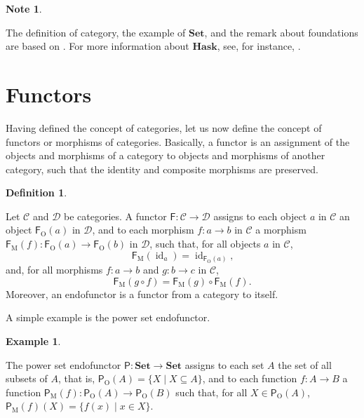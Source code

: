 \documentclass[11pt,letterpaper]{article}
\theoremstyle{definition}
\newtheorem{definition}{Definition}[section]
\newtheorem{example}{Example}[section]
\newtheorem{note}{Note}[section]
\DeclareMathOperator{\obj}{O}
\DeclareMathOperator{\mor}{M}
\DeclareMathOperator{\id}{id}
\newcommand{\idO}[1]{\natO{\id}{#1}}
\newcommand{\comp}{\ensuremath{\mathrel{\circ}}}
\newcommand{\cat}[1]{\ensuremath{\mathcal{#1}}}
\newcommand{\catbf}[1]{\ensuremath{\mathbf{#1}}\xspace}
\newcommand{\hask}{\catbf{Hask}}
\newcommand{\set}{\catbf{Set}}
\newcommand{\func}[1]{\ensuremath{\mathsf{#1}}}
\newcommand{\funcO}[1]{\ensuremath{\func{#1}_{\obj}}}
\newcommand{\funcM}[1]{\ensuremath{\func{#1}_{\mor}}}
\newcommand{\nat}[1]{\ensuremath{#1}}
\newcommand{\natO}[2]{\ensuremath{\nat{#1}_{#2}}}
\begin{document}
\begin{note}
  \label{note:categories}

  The definition of category, the example of \set, and the remark
  about foundations are based on \parencites[4--5]{awodey-2010}[7--9,
    12, 21, 289]{maclane-1998}. For more information about \hask, see,
  for instance, \parencites[74]{elkins-2009}[22, 49--51]{yorgey-2009}.

\end{note}


\section{Functors}
\label{sec:functors}

Having defined the concept of categories, let us now define the
concept of functors or morphisms of categories. Basically, a functor
is an assignment of the objects and morphisms of a category to objects
and morphisms of another category, such that the identity and
composite morphisms are preserved.

\begin{definition}
  \label{def:functor}


  Let \cat{C} and \cat{D} be categories. A functor $\func{F}: \cat{C}
  \to \cat{D}$ assigns to each object $a$ in \cat{C} an object
  $\funcO{F}(a)$ in \cat{D}, and to each morphism $f: a \to b$ in
  \cat{C} a morphism $\funcM{F}(f): \funcO{F}(a) \to \funcO{F}(b)$ in
  \cat{D}, such that, for all objects $a$ in \cat{C},
  \begin{equation}
    \label{eq:functor-identity}
    \funcM{F}(\idO{a}) = \idO{\funcO{F}(a)}
    \text{,}
  \end{equation}
  and, for all morphisms $f: a \to b$ and $g: b \to c$ in \cat{C},
  \begin{equation}
    \label{eq:functor-composition}
    \funcM{F}(g \comp f) = \funcM{F}(g) \comp \funcM{F}(f)
    \text{.}
  \end{equation}
  Moreover, an endofunctor is a functor from a category to itself.

\end{definition}

A simple example is the power set endofunctor.

\begin{example}
  \label{ex:functor-power-set}


  The power set endofunctor $\func{P}: \set \to \set$ assigns to each
  set $A$ the set of all subsets of $A$, that is, $\funcO{P}(A) = \{X
  \mid X \subseteq A\}$, and to each function $f: A \to B$ a function
  $\funcM{P}(f): \funcO{P}(A) \to \funcO{P}(B)$ such that, for all $X
  \in \funcO{P}(A)$, $\funcM{P}(f)(X) = \{f(x) \mid x \in X\}$.

\end{example}
\end{document}

